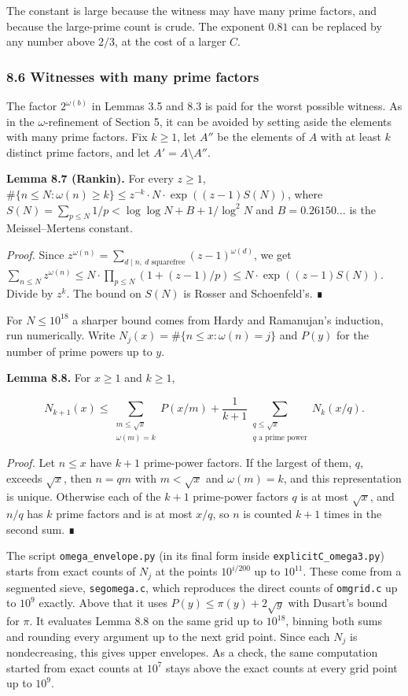 \documentclass[
  11pt,
]{article}
\begin{document}
The constant is large because the witness may have many prime factors,
and because the large-prime count is crude. The exponent \(0.81\) can be
replaced by any number above \(2/3\), at the cost of a larger \(C\).

\subsubsection{8.6 Witnesses with many prime factors}

The factor \(2^{\omega(b)}\) in Lemmas 3.5 and 8.3 is paid for the worst
possible witness. As in the \(\omega\)-refinement of Section 5, it can
be avoided by setting aside the elements with many prime factors. Fix
\(k \ge 1\), let \(A''\) be the elements of \(A\) with at least \(k\)
distinct prime factors, and let \(A' = A \setminus A''\).

\textbf{Lemma 8.7 (Rankin).} For every \(z \ge 1\),
\(\#\{n \le N : \omega(n) \ge k\} \le z^{-k}\cdot N\cdot \exp((z - 1)S(N))\),
where \(S(N) = \sum_{p\le N} 1/p < \log\log N + B + 1/\log^2 N\) and
\(B = 0.26150\dots\) is the Meissel--Mertens constant.

\emph{Proof.} Since
\(z^{\omega(n)} = \sum_{d \mid n,\ d \text{ squarefree}} (z - 1)^{\omega(d)}\),
we get
\(\sum_{n\le N} z^{\omega(n)} \le N\cdot\prod_{p\le N}(1 + (z - 1)/p) \le N\cdot \exp((z - 1)S(N))\).
Divide by \(z^k\). The bound on \(S(N)\) is Rosser and Schoenfeld's. ∎

For \(N \le 10^{18}\) a sharper bound comes from Hardy and Ramanujan's
induction, run numerically. Write
\(N_j(x) = \#\{n \le x : \omega(n) = j\}\) and \(P(y)\) for the number
of prime powers up to \(y\).

\textbf{Lemma 8.8.} For \(x \ge 1\) and \(k \ge 1\),

\[N_{k+1}(x) \le \sum_{\substack{m\le\sqrt{x}\\ \omega(m)=k}} P(x/m) + \frac{1}{k+1}\sum_{\substack{q\le\sqrt{x}\\ q \text{ a prime power}}} N_k(x/q).\]

\emph{Proof.} Let \(n \le x\) have \(k + 1\) prime-power factors. If the
largest of them, \(q\), exceeds \(\sqrt{x}\), then \(n = qm\) with
\(m < \sqrt{x}\) and \(\omega(m) = k\), and this representation is
unique. Otherwise each of the \(k + 1\) prime-power factors \(q\) is at
most \(\sqrt{x}\), and \(n/q\) has \(k\) prime factors and is at most
\(x/q\), so \(n\) is counted \(k + 1\) times in the second sum. ∎

The script \texttt{omega\_envelope.py} (in its final form inside
\texttt{explicitC\_omega3.py}) starts from exact counts of \(N_j\) at
the points \(10^{i/200}\) up to \(10^{11}\). These come from a segmented
sieve, \texttt{segomega.c}, which reproduces the direct counts of
\texttt{omgrid.c} up to \(10^{9}\) exactly. Above that it uses
\(P(y) \le \pi(y) + 2\sqrt{y}\) with Dusart's bound for \(\pi\). It
evaluates Lemma 8.8 on the same grid up to \(10^{18}\), binning both
sums and rounding every argument up to the next grid point. Since each
\(N_j\) is nondecreasing, this gives upper envelopes. As a check, the
same computation started from exact counts at \(10^{7}\) stays above the
exact counts at every grid point up to \(10^{9}\).
\end{document}

